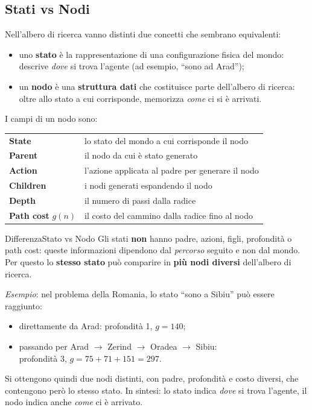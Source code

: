 \documentclass[a4paper, 11pt, oneside]{book}
\theoremstyle{definition}
\begin{document}
	\subsection{Stati vs Nodi}
	Nell'albero di ricerca vanno distinti due concetti che sembrano equivalenti:
	\begin{itemize}
		\item uno \textbf{stato} \`e la rappresentazione di una configurazione fisica del
			mondo: descrive \emph{dove} si trova l'agente (ad esempio, ``sono ad Arad'');

		\item un \textbf{nodo} \`e una \textbf{struttura dati} che costituisce parte
			dell'albero di ricerca: oltre allo stato a cui corrisponde, memorizza
			\emph{come} ci si \`e arrivati.
	\end{itemize}

	I campi di un nodo sono:
	\begin{table}[H]
		\centering
		\renewcommand{\arraystretch}{1.3}
		\begin{tabularx}{\textwidth}{@{}l X@{}}
			\toprule
			\textbf{State} & lo stato del mondo a cui corrisponde il nodo \\
			\textbf{Parent} & il nodo da cui \`e stato generato \\
			\textbf{Action} & l'azione applicata al padre per generare il nodo \\
			\textbf{Children} & i nodi generati espandendo il nodo \\
			\textbf{Depth} & il numero di passi dalla radice \\
			\textbf{Path cost} $g(n)$ & il costo del cammino dalla radice fino al nodo \\
			\bottomrule
		\end{tabularx}
	\end{table}

	\begin{nota}
		{Differenza}{Stato vs Nodo}
		Gli stati \textbf{non} hanno padre, azioni, figli, profondit\`a o path
		cost: queste informazioni dipendono dal \emph{percorso} seguito e non dal
		mondo. Per questo lo \textbf{stesso stato} pu\`o comparire in \textbf{pi\`u
		nodi diversi} dell'albero di ricerca.
	\end{nota}

	\emph{Esempio}: nel problema della Romania, lo stato ``sono a Sibiu'' pu\`o essere
	raggiunto:
	\begin{itemize}
		\item direttamente da Arad: profondit\`a 1, $g = 140$;

		\item passando per Arad $\rightarrow$ Zerind $\rightarrow$ Oradea $\rightarrow$
			Sibiu: \\ profondit\`a 3, ${g = 75 + 71 + 151 = 297}$.
	\end{itemize}
	Si ottengono quindi due nodi distinti, con padre, profondit\`a e costo diversi, che
	contengono per\`o lo stesso stato. In sintesi: lo stato indica \emph{dove} si trova
	l'agente, il nodo indica anche \emph{come} ci \`e arrivato.
\end{document}
